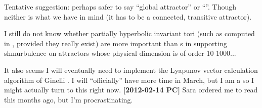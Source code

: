 \begin{description}
Tentative suggestion: perhaps safer to say ``global attractor'' or
``{\nws}''. Though neither is what we have in mind (it has to be a
connected, transitive attractor).

\item[2012-02-14 PC] I still do not know whether partially hyperbolic
invariant tori (such as computed in , provided they really exist)
are more important than \rpo s in supporting shmurbulence on attractors whose
physical dimension is of order 10-1000...

\item[2012-02-06 Evangelos]
It also seems I will eventually need to implement the Lyapunov vector
calculation algorithm of Ginelli \etal{}. I will
``officially'' have more time in March, but I am a
 so I might actually turn to this right now.
{\bf [2012-02-14 PC]} Sara ordered me to read this months ago, but
I'm procrastinating.

\end{description}
